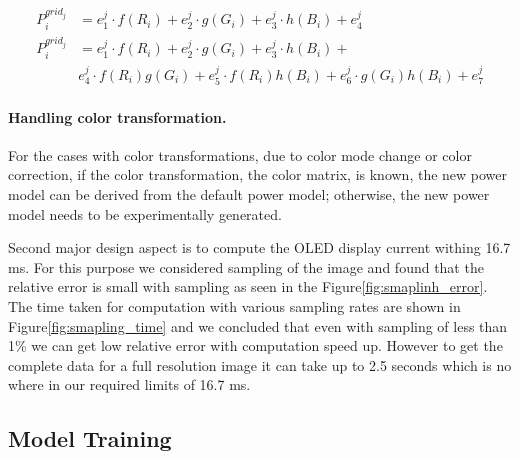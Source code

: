 \vspace{-0.1in}
{\small
  \begin{align}
	P^{grid_j}_i &= e_1^j\cdot f(R_i) + e_2^j\cdot g(G_i) + e_3^j\cdot h(B_i) + e_4^j
	\label{eq:first_order_variable} \\
  P^{grid_j}_i &= e_1^j\cdot f(R_i) + e_2^j\cdot g(G_i) + e_3^j\cdot h(B_i) + \label{eq:second_order_variable} \\
&  e_4^j\cdot f(R_i)g(G_i) +
  e_5^j\cdot f(R_i)h(B_i) +
  e_6^j\cdot g(G_i)h(B_i) +
  e_7^j \nonumber
\end{align}
}
\noindent

\vspace{-0.1in}
\paragraph{Handling color transformation.}
{For the cases with color transformations, \ie due to 
color mode change or color correction,
 if  the color transformation, \ie the color matrix, is known,
 the new power model can be derived from the default power model;
 otherwise, the new power model needs to be experimentally generated.
}

Second major design aspect is to compute the OLED display current withing
16.7 ms. For this purpose we considered sampling of the image and found that
the relative error is small with sampling as seen in the
Figure\ref{fig:smaplinh_error}. The time taken for computation with various
sampling rates are shown in Figure\ref{fig:smapling_time} and we concluded
that even with sampling of less than 1\% we can get low relative error with
computation speed up. However to get the complete data for a full resolution
image it can take up to 2.5 seconds which is no where in our required limits
of 16.7 ms.
\fi



\subsection{Model Training}

